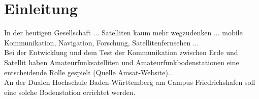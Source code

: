 
\chapter{Einleitung}

 In der heutigen Gesellschaft ... Satelliten kaum mehr wegzudenken ... mobile Kommunikation, Navigation, Forschung, Satellitenfernsehen ...\\
 Bei der Entwicklung und dem Test der Kommunikation zwischen Erde und Satellit haben Amateurfunksatelliten und Amateurfunkbodenstationen eine entscheidende Rolle gespielt (Quelle Amsat-Website)...\\
 An der Dualen Hochschule Baden-Württemberg am Campus Friedrichshafen soll eine solche Bodenstation errichtet werden.

\clearpage
